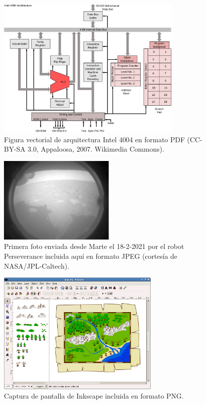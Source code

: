 \documentclass[11pt,a4paper]{article}
\begin{document}
\begin{figure}[hbt]
	\centering 
	\includegraphics[width=0.8\textwidth]{4004arch} 
	\caption[Ejemplo de gráfico vectorial \textsf{PDF}]{Figura vectorial de arquitectura Intel 4004 en formato \textsf{PDF} (CC-BY-SA 3.0, Appaloosa, 2007. Wikimedia Commons).}
	\label{fig:4004arch}
\end{figure}

\begin{figure}[hbt]
	\centering
	\includegraphics[width=0.5\textwidth]{Mars_Perseverance} 
	\caption[Foto histórica enviada desde Marte]{Primera foto enviada desde Marte el {18-2-2021} por el robot Perseverance incluida aquí en formato JPEG (cortesía de NASA/JPL-Caltech).}
	\label{fig:mars}
\end{figure}

\begin{figure}[H]
	\centering
	\includegraphics[width=0.7\textwidth]{inkscape} 
	\caption[Ejemplo de captura en png]{Captura de pantalla de \textsf{Inkscape} incluida en formato \textsf{PNG}.}
	\label{fig:inkscape}
\end{figure}
\end{document}

